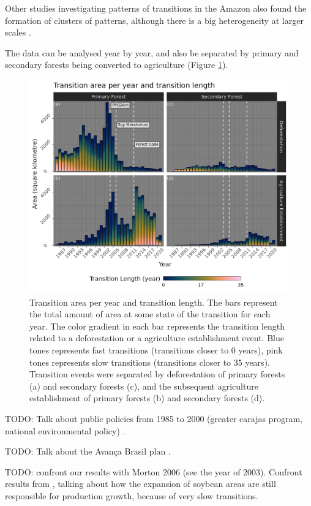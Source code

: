 \documentclass[essd, manuscript]{copernicus}
\begin{document}
Other studies investigating patterns of transitions in the Amazon also found the formation of clusters of patterns, although there is a big heterogeneity at larger scales \citep{MullerHansen2017}.

The data can be analysed year by year, and also be separated by primary and secondary forests being converted to agriculture (Figure \ref{fig:transbar-plot}).

\begin{figure}[ht]
\includegraphics[width=17cm]{figs/trans_length_cols} \caption{Transition area per year and transition length. The bars represent the total amount of area at some state of the transition for each year. The color gradient in each bar represents the transition length related to a deforestation or a agriculture establishment event. Blue tones represents fast transitions (transitions closer to 0 years), pink tones represents slow transitions (transitions closer to 35 years). Transition events were separated by deforestation of primary forests (a) and secondary forests (c), and the subsequent  agriculture establishment of primary forests (b) and secondary forests (d).}\label{fig:transbar-plot}
\end{figure}

TODO: Talk about public policies from 1985 to 2000 (greater carajas program, national environmental policy) \citep{Banerjee2009}.

TODO: Talk about the Avança Brasil plan \citep{Carvalho2002, Banerjee2009}.

TODO: confront our results with Morton 2006 (see the year of 2003).
Confront results from \citep{Macedo2012}, talking about how the expansion of soybean areas are still responsible for production growth, because of very slow transitions.
\end{document}

